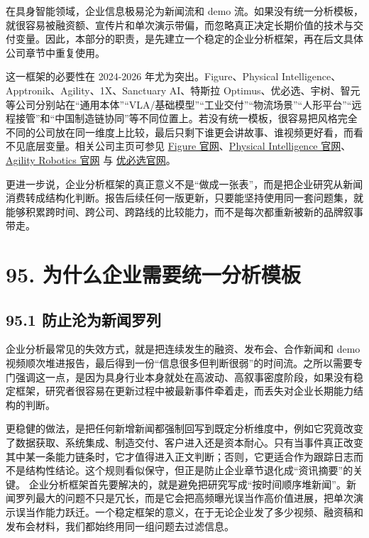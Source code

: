 

在具身智能领域，企业信息极易沦为新闻流和 demo 流。如果没有统一分析模板，就很容易被融资额、宣传片和单次演示带偏，而忽略真正决定长期价值的技术与交付变量。因此，本部分的职责，是先建立一个稳定的企业分析框架，再在后文具体公司章节中重复使用。

这一框架的必要性在 2024-2026 年尤为突出。Figure、Physical Intelligence、Apptronik、Agility、1X、Sanctuary AI、特斯拉 Optimus、优必选、宇树、智元等公司分别站在“通用本体”“VLA/基础模型”“工业交付”“物流场景”“人形平台”“远程接管”和“中国制造链协同”等不同位置上。若没有统一模板，很容易把风格完全不同的公司放在同一维度上比较，最后只剩下谁更会讲故事、谁视频更好看，而看不见底层变量。相关公司主页可参见 \href{https://www.figure.ai/}{Figure 官网}、\href{https://www.physicalintelligence.company/}{Physical Intelligence 官网}、\href{https://agilityrobotics.com/}{Agility Robotics 官网} 与 \href{https://www.ubtrobot.com/}{优必选官网}。

更进一步说，企业分析框架的真正意义不是“做成一张表”，而是把企业研究从新闻消费转成结构化判断。报告后续任何一版更新，只要能坚持使用同一套问题集，就能够积累跨时间、跨公司、跨路线的比较能力，而不是每次都重新被新的品牌叙事带走。

\section*{95. 为什么企业需要统一分析模板}

\subsection*{95.1 防止沦为新闻罗列}


企业分析最常见的失效方式，就是把连续发生的融资、发布会、合作新闻和 demo 视频顺次堆进报告，最后得到一份“信息很多但判断很弱”的时间流。之所以需要专门强调这一点，是因为具身行业本身就处在高波动、高叙事密度阶段，如果没有稳定框架，研究者很容易在更新过程中被最新事件牵着走，而丢失对企业长期能力结构的判断。

更稳健的做法，是把任何新增新闻都强制回写到既定分析维度中，例如它究竟改变了数据获取、系统集成、制造交付、客户进入还是资本耐心。只有当事件真正改变其中某一条能力链条时，它才值得进入正文判断；否则，它更适合作为跟踪日志而不是结构性结论。这个规则看似保守，但正是防止企业章节退化成“资讯摘要”的关键。 企业分析框架首先要解决的，就是避免把研究写成“按时间顺序堆新闻”。新闻罗列最大的问题不只是冗长，而是它会把高频曝光误当作高价值进展，把单次演示误当作能力跃迁。一个稳定框架的意义，在于无论企业发了多少视频、融资稿和发布会材料，我们都始终用同一组问题去过滤信息。

